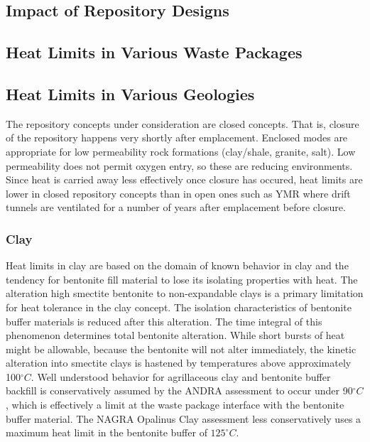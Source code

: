 \subsection{Impact of Repository Designs}

\subsection{Heat Limits in Various Waste Packages} 




\subsection{Heat Limits in Various Geologies}

The repository concepts under consideration are closed concepts. That is, 
closure of the repository happens very shortly after emplacement.
Enclosed modes are appropriate for low permeability rock formations (clay/shale, 
granite, salt). Low permeability does not permit oxygen entry, so these are
reducing environments. Since heat is carried away less effectively once closure 
has occured, heat limits are lower in  closed repository concepts than in open 
ones such as \gls{YMR} where drift tunnels are ventilated for a number of years
after emplacement before closure.

\subsubsection{Clay} 

Heat limits in clay are based on the domain of known behavior in clay and the 
tendency for bentonite fill material to lose its isolating properties with heat. 
The alteration high smectite bentonite to non-expandable clays is a primary 
limitation for heat tolerance in the clay concept. The isolation characteristics 
of bentonite buffer materials is reduced after this alteration. The time 
integral of this phenomenon determines total bentonite alteration. While short 
bursts of heat might be allowable, because the bentonite will not alter 
immediately, the kinetic alteration into smectite clays is hastened by 
temperatures above approximately 100$^\circ C$. \cite{pusch_alteration_1987} 
Well understood behavior for agrillaceous clay and bentonite buffer backfill
is conservatively assumed by the \gls{ANDRA} assessment to occur under 
90$^\circ C$, which is effectively a limit at the waste package interface with 
the bentonite buffer material.\cite{andra_argile:_2005} 
The \gls{NAGRA} Opalinus Clay assessment less conservatively 
uses a maximum heat limit in the bentonite buffer of $125^\circ C$.
\cite{johnson_project_2002} 

